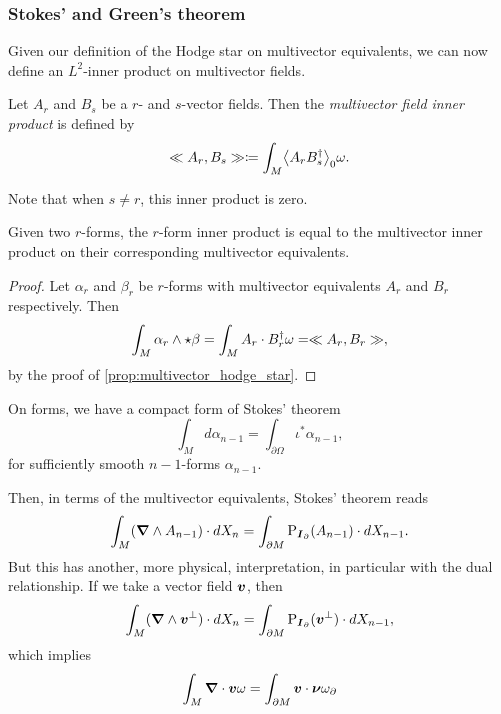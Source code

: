 \subsubsection{Stokes' and Green's theorem}

Given our definition of the Hodge star on multivector equivalents, we can now define an $L^2$-inner product on multivector fields.

\begin{definition}
Let $A_r$ and $B_s$ be a $r$- and $s$-vector fields. Then the \emph{multivector field inner product} is defined by
\begin{equation}
\multivecinnerproduct{A_r}{B_s} \coloneqq \int_M \proj{0}{A_r B_s^\dagger} \omega.
\end{equation}
\end{definition}
Note that when $s\neq r$, this inner product is zero.

\begin{corollary}
Given two $r$-forms, the $r$-form inner product is equal to the multivector inner product on their corresponding multivector equivalents.
\end{corollary}
\begin{proof}
Let $\alpha_r$ and $\beta_r$ be $r$-forms with multivector equivalents $A_r$ and $B_r$ respectively. Then
\begin{align*}
    \int_M \alpha_r \wedge \star \beta = \int_M A_r \cdot B_r^\dagger \omega = \ll A_r, B_r\gg,
\end{align*}
by the proof of \cref{prop:multivector_hodge_star}. 
\end{proof}

On forms, we have a compact form of Stokes' theorem
\[
\int_M d \alpha_{n-1} = \int_{\partial \Omega} \iota^* \alpha_{n-1},
\]
for sufficiently smooth $n-1$-forms $\alpha_{n-1}$. 


Then, in terms of the multivector equivalents, Stokes' theorem reads
\begin{equation}
\label{eq:stokes_theorem}
\int_M (\boldsymbol{\nabla} \wedge A_{n-1})\cdot dX_n = \int_{\partial M} \operatorname{P}_{\boldsymbol{I}_\partial}(A_{n-1}) \cdot dX_{n-1}.
\end{equation}
But this has another, more physical, interpretation, in particular with the dual relationship. If we take a vector field $\boldsymbol{v}$, then
\begin{equation}
\label{eq:stokes_theorem_dual}
\int_M (\boldsymbol{\nabla} \wedge \boldsymbol{v}^\perp) \cdot dX_n = \int_{\partial M} \operatorname{P}_{\boldsymbol{I}_\partial}(\boldsymbol{v}^\perp) \cdot dX_{n-1},
\end{equation}
which implies
\begin{equation}
\int_M \boldsymbol{\nabla} \cdot \boldsymbol{v} \omega = \int_{\partial M} \boldsymbol{v}\cdot \boldsymbol{\nu} \omega_\partial
\end{equation}



